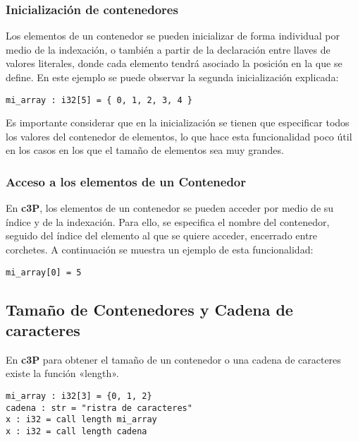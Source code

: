 \subsubsection{Inicialización de contenedores}

Los elementos de un contenedor se pueden inicializar de forma individual por medio de
la indexación, o también a partir de la declaración entre llaves de valores literales,
donde cada elemento tendrá asociado la posición en la que se define. En este ejemplo
se puede observar la segunda inicialización explicada:

\begin{verbatim}
mi_array : i32[5] = { 0, 1, 2, 3, 4 }
\end{verbatim}

Es importante considerar que en la inicialización se tienen que especificar todos los
valores del contenedor de elementos, lo que hace esta funcionalidad poco útil en
los casos en los que el tamaño de elementos sea muy grandes.

\subsubsection{Acceso a los elementos de un Contenedor}

En \textbf{c3P}, los elementos de un contenedor se pueden acceder por medio de su índice y
de la indexación. Para ello, se especifica el nombre del contenedor, seguido del índice del
elemento al que se quiere acceder, encerrado entre corchetes. A continuación se muestra un
ejemplo de esta funcionalidad:

\begin{verbatim}
mi_array[0] = 5
\end{verbatim}

\subsection{Tamaño de Contenedores y Cadena de caracteres}

En \textbf{c3P} para obtener el tamaño de un contenedor o una cadena de caracteres existe la función «length».

\begin{verbatim}
mi_array : i32[3] = {0, 1, 2}
cadena : str = "ristra de caracteres"
x : i32 = call length mi_array
x : i32 = call length cadena
\end{verbatim}
